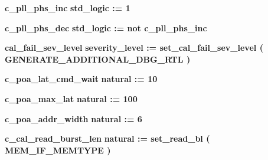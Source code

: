 \begin{DoxyCompactItemize}
\item 
{\bf c\+\_\+pll\+\_\+phs\+\_\+inc} {\bfseries \textcolor{comment}{std\+\_\+logic}\textcolor{vhdlchar}{ }\textcolor{vhdlchar}{ }\textcolor{vhdlchar}{\+:}\textcolor{vhdlchar}{=}\textcolor{vhdlchar}{ }\textcolor{vhdlchar}{ }\textcolor{vhdlchar}{\textquotesingle{}}\textcolor{vhdlchar}{ } \textcolor{vhdldigit}{1} \textcolor{vhdlchar}{ }\textcolor{vhdlchar}{\textquotesingle{}}\textcolor{vhdlchar}{ }} 
\item 
{\bf c\+\_\+pll\+\_\+phs\+\_\+dec} {\bfseries \textcolor{comment}{std\+\_\+logic}\textcolor{vhdlchar}{ }\textcolor{vhdlchar}{ }\textcolor{vhdlchar}{\+:}\textcolor{vhdlchar}{=}\textcolor{vhdlchar}{ }\textcolor{keywordflow}{not}\textcolor{vhdlchar}{ }\textcolor{vhdlchar}{ }\textcolor{vhdlchar}{ }\textcolor{vhdlchar}{ }{\bfseries {\bf c\+\_\+pll\+\_\+phs\+\_\+inc}} \textcolor{vhdlchar}{ }} 
\item 
{\bf cal\+\_\+fail\+\_\+sev\+\_\+level} {\bfseries \textcolor{vhdlchar}{severity\+\_\+level}\textcolor{vhdlchar}{ }\textcolor{vhdlchar}{ }\textcolor{vhdlchar}{\+:}\textcolor{vhdlchar}{=}\textcolor{vhdlchar}{ }\textcolor{vhdlchar}{ }\textcolor{vhdlchar}{ }\textcolor{vhdlchar}{ }\textcolor{vhdlchar}{set\+\_\+cal\+\_\+fail\+\_\+sev\+\_\+level}\textcolor{vhdlchar}{ }\textcolor{vhdlchar}{(}\textcolor{vhdlchar}{ }{\bfseries {\bf G\+E\+N\+E\+R\+A\+T\+E\+\_\+\+A\+D\+D\+I\+T\+I\+O\+N\+A\+L\+\_\+\+D\+B\+G\+\_\+\+R\+TL}} \textcolor{vhdlchar}{ }\textcolor{vhdlchar}{ }\textcolor{vhdlchar}{)}\textcolor{vhdlchar}{ }} 
\item 
{\bf c\+\_\+poa\+\_\+lat\+\_\+cmd\+\_\+wait} {\bfseries \textcolor{comment}{natural}\textcolor{vhdlchar}{ }\textcolor{vhdlchar}{ }\textcolor{vhdlchar}{\+:}\textcolor{vhdlchar}{=}\textcolor{vhdlchar}{ }\textcolor{vhdlchar}{ } \textcolor{vhdldigit}{10} \textcolor{vhdlchar}{ }} 
\item 
{\bf c\+\_\+poa\+\_\+max\+\_\+lat} {\bfseries \textcolor{comment}{natural}\textcolor{vhdlchar}{ }\textcolor{vhdlchar}{ }\textcolor{vhdlchar}{\+:}\textcolor{vhdlchar}{=}\textcolor{vhdlchar}{ }\textcolor{vhdlchar}{ } \textcolor{vhdldigit}{100} \textcolor{vhdlchar}{ }} 
\item 
{\bf c\+\_\+poa\+\_\+addr\+\_\+width} {\bfseries \textcolor{comment}{natural}\textcolor{vhdlchar}{ }\textcolor{vhdlchar}{ }\textcolor{vhdlchar}{\+:}\textcolor{vhdlchar}{=}\textcolor{vhdlchar}{ }\textcolor{vhdlchar}{ } \textcolor{vhdldigit}{6} \textcolor{vhdlchar}{ }} 
\item 
{\bf c\+\_\+cal\+\_\+read\+\_\+burst\+\_\+len} {\bfseries \textcolor{comment}{natural}\textcolor{vhdlchar}{ }\textcolor{vhdlchar}{ }\textcolor{vhdlchar}{\+:}\textcolor{vhdlchar}{=}\textcolor{vhdlchar}{ }\textcolor{vhdlchar}{ }\textcolor{vhdlchar}{ }\textcolor{vhdlchar}{ }\textcolor{vhdlchar}{set\+\_\+read\+\_\+bl}\textcolor{vhdlchar}{ }\textcolor{vhdlchar}{(}\textcolor{vhdlchar}{ }{\bfseries {\bf M\+E\+M\+\_\+\+I\+F\+\_\+\+M\+E\+M\+T\+Y\+PE}} \textcolor{vhdlchar}{ }\textcolor{vhdlchar}{ }\textcolor{vhdlchar}{)}\textcolor{vhdlchar}{ }} 

\end{DoxyCompactItemize}

